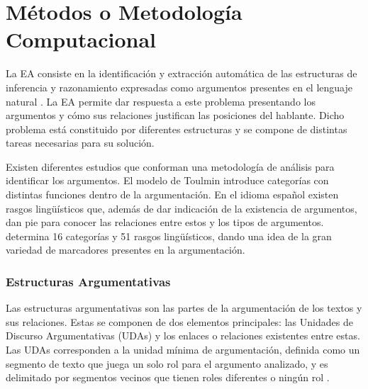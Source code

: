 \documentclass{rcci} %
\begin{document}
\parskip=12pt
\section*{M\'etodos o Metodolog\'ia Computacional}\label{metodos}




La EA consiste en la identificaci\'on y extracci\'on 
autom\'atica de las estructuras de inferencia y 
razonamiento expresadas como argumentos presentes en el lenguaje natural \cite{lawrence2020argument}.
La EA permite dar respuesta a este problema presentando
los argumentos y c\'omo sus relaciones justifican las posiciones del hablante. Dicho problema est\'a constituido por diferentes 
estructuras y se compone de distintas tareas necesarias para su soluci\'on.

Existen diferentes estudios que conforman una metodolog\'ia de an\'alisis para
identificar los argumentos. El modelo de Toulmin \cite{toulmin_2003} introduce categor\'ias 
con distintas funciones dentro de la argumentaci\'on. En 
el idioma espa\~nol existen rasgos ling\"u\'isticos que, adem\'as de dar indicaci\'on de la existencia de argumentos, 
dan pie para conocer las relaciones entre estos y los tipos de argumentos. \citep{venegas2005hacia}
determina 16 categor\'ias y 51 rasgos ling\"u\'isticos, dando una idea de la gran variedad de marcadores 
presentes en la argumentaci\'on.

\subsubsection*{Estructuras Argumentativas}

Las estructuras argumentativas son las partes de la argumentaci\'on de los textos y sus relaciones.
Estas se componen de dos elementos principales: las Unidades de Discurso Argumentativas (UDAs) y los enlaces
o relaciones existentes entre estas. Las UDAs corresponden a la unidad m\'inima de argumentaci\'on, definida 
como un segmento de texto que juega un solo rol para el argumento analizado, y es 
delimitado por segmentos vecinos que tienen roles diferentes o ning\'un rol \cite{stede2018argumentation}.
\end{document}
